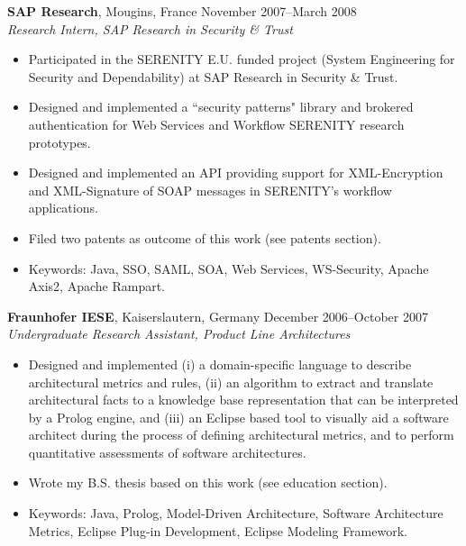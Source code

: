 \documentclass[line,margin]{res}
\begin{document}
\begin{resume}
                \textbf{SAP Research}, Mougins, France \hfill November 2007--March 2008 \\
                {\sl Research Intern, SAP Research in Security \& Trust}
                \begin{itemize}  \itemsep -2pt
                \item Participated in the SERENITY E.U. funded project (System Engineering for Security and 
                Dependability) at SAP Research in Security \& Trust.
                \item Designed and implemented a ``security patterns" library and brokered authentication for 
                Web Services and Workflow SERENITY research prototypes.
                \item Designed and implemented an API providing support for XML-Encryption and 
                XML-Signature of SOAP messages in SERENITY's workflow applications.
                \item Filed two patents as outcome of this work (see patents section).
                \item Keywords: Java, SSO, SAML, SOA, Web Services, WS-Security, Apache Axis2,
                Apache Rampart.
                \end{itemize} 
                
                \textbf{Fraunhofer IESE}, Kaiserslautern, Germany \hfill December 2006--October 2007\\
                {\sl Undergraduate Research Assistant, Product Line Architectures}
                \begin{itemize}  \itemsep -2pt
                \item Designed and implemented (i) a domain-specific language to describe architectural 
                metrics and rules, (ii) an algorithm to extract and translate architectural facts to a knowledge 
                base representation that can be interpreted by a Prolog engine, and (iii) an Eclipse based tool 
                to visually aid a software architect during the process of defining architectural metrics, and to 
                perform quantitative assessments of software architectures.
                \item Wrote my B.S. thesis based on this work (see education section).
                \item Keywords: Java, Prolog, Model-Driven Architecture, Software Architecture Metrics, 
                Eclipse Plug-in Development, Eclipse Modeling Framework.
                \end{itemize}
                

\end{resume}
\end{document}
